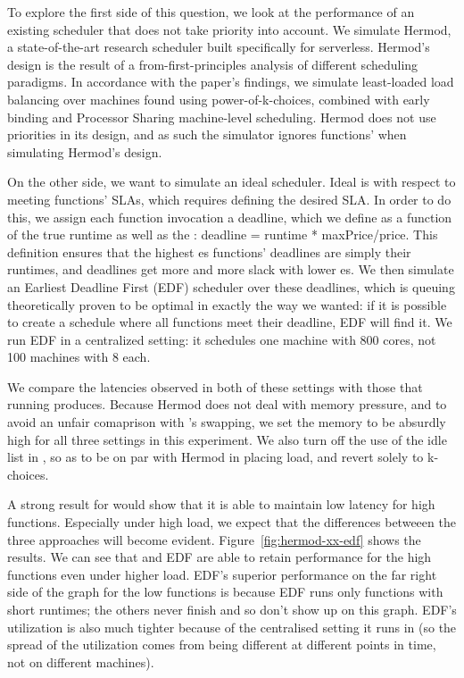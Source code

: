 To explore the first side of this question, we look at the performance of an
existing scheduler that does not take priority into account. We simulate
Hermod\cite{hermod}, a state-of-the-art research scheduler built specifically
for serverless. Hermod's design is the result of a from-first-principles
analysis of different scheduling paradigms. In accordance with the paper's
findings, we simulate least-loaded load balancing over machines found using
power-of-k-choices, combined with early binding and Processor Sharing
machine-level scheduling. Hermod does not use priorities in its design, and as
such the simulator ignores functions' \class{} when simulating Hermod's design.


On the other side, we want to simulate an ideal scheduler. Ideal is with respect
to meeting functions' SLAs, which requires defining the desired SLA. In order to
do this, we assign each function invocation a deadline, which we define as a
function of the true runtime as well as the \priceclass{}: deadline = runtime *
maxPrice/price. This definition ensures that the highest \class{}es functions'
deadlines are simply their runtimes, and deadlines get more and more slack with
lower \class{}es. We then simulate an Earliest Deadline First (EDF) scheduler
over these deadlines, which is queuing theoretically proven to be optimal in
exactly the way we wanted: if it is possible to create a schedule where all
functions meet their deadline, EDF will find it\cite{wiki-edf}. We run EDF in a
centralized setting: it schedules one machine with 800 cores, not 100 machines
with 8 each.

We compare the latencies observed in both of these settings with those that
running \sys{} produces. Because Hermod does not deal with memory pressure, and
to avoid an unfair comaprison with \sys{}'s swapping, we set the memory to be
absurdly high for all three settings in this experiment. We also turn off the
use of the idle list in \sys{}, so as to be on par with Hermod in placing load,
and revert solely to k-choices.

A strong result for \sys{} would show that it is able to maintain low latency
for high \priceclass{} functions. Especially under high load, we expect that the
differences betweeen the three approaches will become evident.
Figure~\ref{fig:hermod-xx-edf} shows the results. We can see that \sys{} and EDF
are able to retain performance for the high \class{} functions even under higher
load. EDF's superior performance on the far right side of the graph for the low
\class{} functions is because EDF runs only functions with short runtimes; the
others never finish and so don't show up on this graph. EDF's utilization is
also much tighter because of the centralised setting it runs in (so the spread
of the utilization comes from being different at different points in time, not
on different machines).


